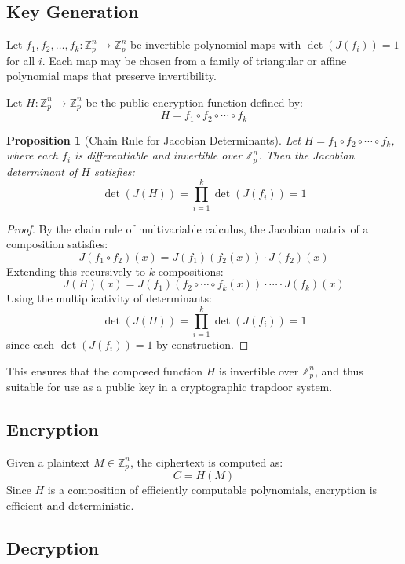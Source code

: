 \documentclass[12pt]{article}
\newtheorem{proposition}{Proposition}
\begin{document}
\subsection*{Key Generation}

Let \( f_1, f_2, \dots, f_k : \mathbb{Z}_p^n \rightarrow \mathbb{Z}_p^n \) be invertible polynomial maps with \( \det(J(f_i)) = 1 \) for all \( i \). Each map may be chosen from a family of triangular or affine polynomial maps that preserve invertibility.

Let \( H : \mathbb{Z}_p^n \to \mathbb{Z}_p^n \) be the public encryption function defined by:
\[
H = f_1 \circ f_2 \circ \cdots \circ f_k
\]


\begin{proposition}[Chain Rule for Jacobian Determinants]
Let \( H = f_1 \circ f_2 \circ \cdots \circ f_k \), where each \( f_i \) is differentiable and invertible over \( \mathbb{Z}_p^n \). Then the Jacobian determinant of \( H \) satisfies:
\[
\det(J(H)) = \prod_{i=1}^k \det(J(f_i)) = 1
\]
\end{proposition}

\begin{proof}
By the chain rule of multivariable calculus, the Jacobian matrix of a composition satisfies:
\[
J(f_1 \circ f_2)(x) = J(f_1)(f_2(x)) \cdot J(f_2)(x)
\]
Extending this recursively to \( k \) compositions:
\[
J(H)(x) = J(f_1)(f_2 \circ \cdots \circ f_k(x)) \cdot \cdots \cdot J(f_k)(x)
\]
Using the multiplicativity of determinants:
\[
\det(J(H)) = \prod_{i=1}^k \det(J(f_i)) = 1
\]
since each \( \det(J(f_i)) = 1 \) by construction.
\end{proof}

This ensures that the composed function \( H \) is invertible over \( \mathbb{Z}_p^n \), and thus suitable for use as a public key in a cryptographic trapdoor system.

\subsection*{Encryption}

Given a plaintext \( M \in \mathbb{Z}_p^n \), the ciphertext is computed as:
\[
C = H(M)
\]
Since \( H \) is a composition of efficiently computable polynomials, encryption is efficient and deterministic.

\subsection*{Decryption}
\end{document}
